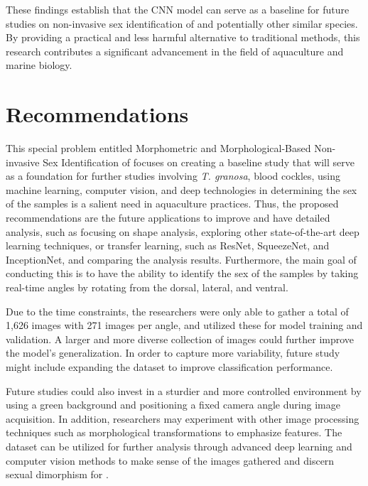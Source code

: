 These findings establish that the CNN model can serve as a baseline for future studies on non-invasive sex identification of \Tgranosa and potentially other similar species. By providing a practical and less harmful alternative to traditional methods, this research contributes a significant advancement in the field of aquaculture and marine biology.

\section{Recommendations}

This special problem entitled Morphometric and Morphological-Based Non-invasive Sex Identification of \Tgranosa focuses on creating a baseline study that will serve as a foundation for further studies involving \textit{T. granosa}, blood cockles, using machine learning, computer vision, and deep technologies in determining the sex of the samples is a salient need in aquaculture practices. Thus, the proposed recommendations are the future applications to improve and have detailed analysis, such as focusing on shape analysis, exploring other state-of-the-art deep learning techniques, or transfer learning, such as ResNet, SqueezeNet, and InceptionNet, and comparing the analysis results. Furthermore, the main goal of conducting this is to have the ability to identify the sex of the samples by taking real-time angles by rotating from the dorsal, lateral, and ventral.

Due to the time constraints, the researchers were only able to gather a total of 1,626 images with 271 images per angle, and utilized these for model training and validation. A larger and more diverse collection of images could further improve the model’s generalization. In order to capture more variability, future study might include expanding the dataset to improve classification performance. 

Future studies could also invest in a  sturdier and more controlled environment by using a green background and positioning a fixed camera angle during image acquisition. In addition, researchers may experiment with other image processing techniques such as morphological transformations to emphasize features. The dataset can be utilized for further analysis through advanced deep learning and computer vision methods to make sense of the images gathered and discern sexual dimorphism for \Tgranosa. 